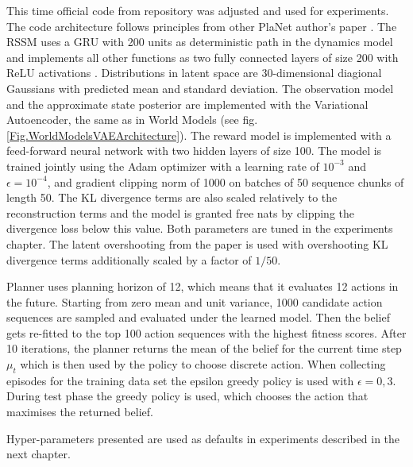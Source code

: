 This time official code from repository \cite{Code.PlaNet} was adjusted and used for experiments. The code architecture follows principles from other PlaNet author's paper \cite{Code.TFAgents}.
The RSSM uses a GRU \cite{Algo.GRU} with 200 units as deterministic path in the dynamics model and implements all other functions as two fully connected layers of size 200 with ReLU activations \cite{Algo.ReLU}. Distributions in latent space are 30-dimensional diagional Gaussians with predicted mean and standard deviation.
The observation model and the approximate state posterior are implemented with the Variational Autoencoder, the same as in World Models (see fig.\ref{Fig.WorldModelsVAEArchitecture}). The reward model is implemented with a feed-forward neural network with two hidden layers of size 100.
The model is trained jointly using the Adam optimizer \cite{Algo.Adam} with a learning rate of $10^{-3}$ and $\epsilon = 10^{−4}$, and gradient clipping norm of 1000 on batches of 50 sequence chunks of length 50. The KL divergence terms are also scaled relatively to the reconstruction terms and the model is granted free nats by clipping the divergence loss below this value. Both parameters are tuned in the experiments chapter. The latent overshooting from the paper \cite{Algo.PlaNet} is used with overshooting KL divergence terms additionally scaled by a factor of $1/50$. 

Planner uses planning horizon of 12, which means that it evaluates 12 actions in the future. Starting from zero mean and unit variance, 1000 candidate action sequences are sampled and evaluated under the learned model. Then the belief gets re-fitted to the top 100 action sequences with the highest fitness scores. After 10 iterations, the planner returns the mean of the belief for the current time step $\mu_t$ which is then used by the policy to choose discrete action. When collecting episodes for the training data set the epsilon greedy policy is used with $\epsilon = 0,3$. During test phase the greedy policy is used, which chooses the action that maximises the returned belief.

Hyper-parameters presented are used as defaults in experiments described in the next chapter.

